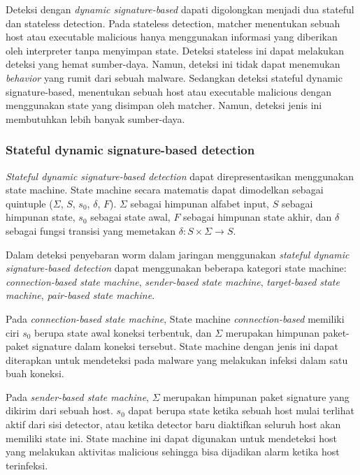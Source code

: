 Deteksi dengan \textit{dynamic signature-based} dapati digolongkan menjadi dua stateful dan stateless detection. Pada stateless detection, matcher menentukan sebuah host atau executable malicious hanya menggunakan informasi yang diberikan oleh interpreter tanpa menyimpan state. Deteksi stateless ini dapat melakukan deteksi yang hemat sumber-daya. Namun, deteksi ini tidak dapat menemukan \textit{behavior} yang rumit dari sebuah malware. Sedangkan deteksi stateful dynamic signature-based, menentukan sebuah host atau executable malicious dengan menggunakan state yang disimpan oleh matcher. Namun, deteksi jenis ini membutuhkan lebih banyak sumber-daya.

\subsubsection{Stateful dynamic signature-based detection}

\textit{Stateful dynamic signature-based detection} dapat direpresentasikan menggunakan state machine. State machine secara matematis dapat dimodelkan sebagai quintuple ($\Sigma$, $S$, $s_0$, $\delta$, $F$). $\Sigma$ sebagai himpunan alfabet input, $S$ sebagai himpunan state, $s_0$ sebagai state awal, $F$ sebagai himpunan state akhir, dan $\delta$ sebagai fungsi transisi yang memetakan $\delta : S \times \Sigma \rightarrow S$. 

Dalam deteksi penyebaran worm dalam jaringan menggunakan \textit{stateful dynamic signature-based detection} dapat menggunakan beberapa kategori state machine: \textit{connection-based state machine}, \textit{sender-based state machine}, \textit{target-based state machine}, \textit{pair-based state machine}.

Pada \textit{connection-based state machine}, State machine \textit{connection-based} memiliki ciri $s_0$ berupa state awal koneksi terbentuk, dan $\Sigma$ merupakan himpunan paket-paket signature dalam koneksi tersebut. State machine dengan jenis ini dapat diterapkan untuk mendeteksi pada malware yang melakukan infeksi dalam satu buah koneksi.

Pada \textit{sender-based state machine}, $\Sigma$ merupakan himpunan paket signature yang dikirim dari sebuah host. $s_0$ dapat berupa state ketika sebuah host mulai terlihat aktif dari sisi detector, atau ketika detector baru diaktifkan seluruh host akan memiliki state ini. State machine ini dapat digunakan untuk mendeteksi host yang melakukan aktivitas malicious sehingga bisa dijadikan alarm ketika host terinfeksi.


